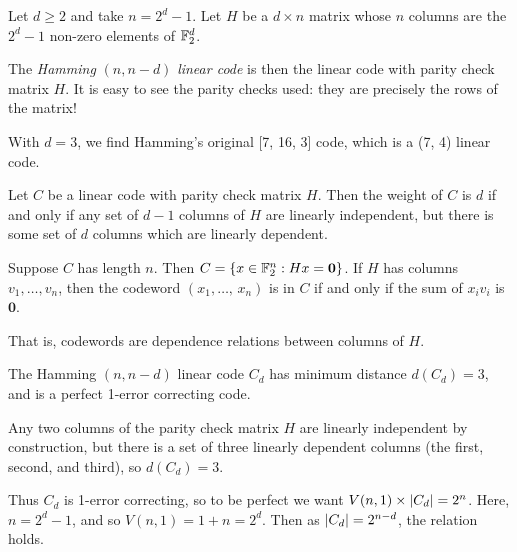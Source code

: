 \documentclass{article}
\begin{document}
\begin{definition}
    Let $d \geq 2$ and take $n = 2^d - 1$. Let $H$ be a $d \times n$ matrix whose $n$ columns are the $2^d-1$ non-zero elements of $\mathbb{F}_2^d$.
    
    The \textit{Hamming} $(n, n-d)$ \textit{linear code} is then the  linear code with parity check matrix $H$. It is easy to see the parity checks used: they are precisely the rows of the matrix!
\end{definition}

\begin{note}
	With $d = 3$, we find Hamming's original [7, 16, 3] code, which is a (7, 4) linear code.
\end{note}

\begin{proposition}
    Let $C$ be a linear code with parity check matrix $H$. Then the weight of $C$ is $d$ if and only if any set of $d-1$ columns of $H$ are linearly independent, but there is some set of $d$ columns which are linearly dependent.
\end{proposition}

\begin{prf}
    Suppose $C$ has length $n$. Then $C = \left\lbrace x \in \mathbb{F}_2^n : Hx = \mathbf{0} \right\rbrace$. If $H$ has columns $v_1, \dots, v_n$, then the codeword $(x_1, \dots, \, x_n)$ is in $C$ if and only if the sum of $x_iv_i$ is $\mathbf{0}$.
    
    That is, codewords are dependence relations between columns of $H$.
\end{prf}

\begin{corollary}
    The Hamming $(n, n-d)$ linear code $C_d$ has minimum distance $d(C_d) = 3$, and is a perfect 1-error correcting code.
\end{corollary}

\begin{prf}
    Any two columns of the parity check matrix $H$ are linearly independent by construction, but there is a set of three linearly dependent columns (the first, second, and third), so $d(C_d) = 3$.
    
    Thus $C_d$ is 1-error correcting,
    so to be perfect we want $V(n, 1) \times \left\lvert C_d \right\rvert = 2^n$.
    Here, $n = 2^d-1$, and so $V(n, 1) = 1+n = 2^d$.
    Then as $\left\lvert C_d \right\rvert = 2^{n-d}$, the relation holds.
\end{prf}

\end{document}
